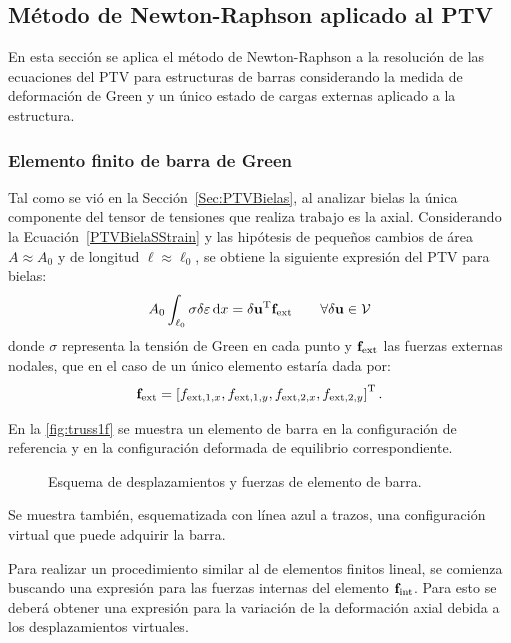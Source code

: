 \subsection{Método de Newton-Raphson aplicado al PTV}

En esta sección se aplica el método de Newton-Raphson a la resolución de las ecuaciones del PTV para estructuras de barras considerando la medida de deformación de Green y un único estado de cargas externas aplicado a la estructura.

\subsubsection{Elemento finito de barra de Green}

Tal como se vió en la Sección~\ref{Sec:PTVBielas}, al analizar bielas la única componente del tensor de tensiones que realiza trabajo es la axial. %
%
Considerando la Ecuación~\eqref{PTVBielaSStrain} y las hipótesis de pequeños cambios de área $A\approx A_0$ y de longitud $\ell\approx \ell_0$, se obtiene la siguiente expresión del PTV para bielas:
%
\begin{equation}\label{eqn:ptvbielaA0}
A_0 \int_{\ell_0} \sigma \delta \varepsilon \, {\text{d}} x = \delta {\bf u}^{\text{T}} {\bf f}_{\text{ext}}   \qquad \forall \delta {\bf u} \in {\mathcal V}
\end{equation}
%
donde $\sigma$ representa la tensión de Green en cada punto y ${\bf f}_{\text{ext}}$ las fuerzas externas nodales, que en el caso de un único elemento estaría dada por:
%
\begin{equation}
{\bf f}_{\text{ext}} = \left[ f_{\text{ext},1,x}, f_{\text{ext},1,y}, f_{\text{ext},2,x}, f_{\text{ext},2,y} \right]^{\text{T}}.
\end{equation}

En la \autoref{fig:truss1f} se muestra un elemento de barra en la configuración de referencia y en la configuración deformada de equilibrio correspondiente. %
%
\begin{figure}[htb]
	\centering
	\def\svgwidth{0.7\textwidth}
    
	\caption{Esquema de desplazamientos y fuerzas de elemento de barra.}
	\label{fig:truss1f}
\end{figure}
%
Se muestra también, esquematizada con línea azul a trazos, una configuración virtual que puede adquirir la barra.


Para realizar un procedimiento similar al de elementos finitos lineal, se comienza buscando una expresión para las fuerzas internas del elemento ${\bf f}_{\text{int}}$. %
%
Para esto se deberá obtener una expresión para la variación de la deformación axial debida a los desplazamientos virtuales. %


